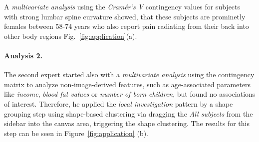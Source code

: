 \documentclass[journal]{style/vgtc} 			          %
\newcommand{\com}[1]{\textcolor{orange}{\uline{#1}}}
\begin{document}
A \emph{multivariate analysis} using the \emph{Cram\'{e}r's V} contingency values for subjects with strong lumbar spine curvature showed, that these subjects are prominetly females between 58-74 years who also report pain radiating from their back into other body regions Fig.~\ref{fig:application}(a).
%
%
\paragraph{Analysis 2.}
%
The second expert started also with a \emph{multivariate analysis} using the contingency matrix to analyze non-image-derived features, such as age-associated parameters like \emph{income}, \emph{blood fat values} or \emph{number of born children}, but found no associations of interest.
%
Therefore, he applied the \emph{local investigation} pattern by a shape grouping step using shape-based clustering via dragging the \emph{All subjects} from the sidebar into the canvas area, triggering the shape clustering.
%
The results for this step can be seen in Figure~\ref{fig:application} (b).
\end{document}
